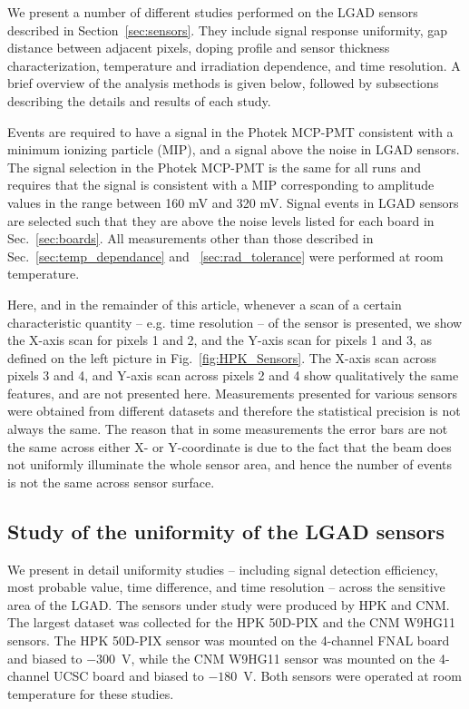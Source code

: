 \documentclass[preprint,1p]{elsarticle}
\begin{document}
We present a number of different studies performed on the LGAD sensors 
described in Section~\ref{sec:sensors}. They include signal response 
uniformity, gap distance between adjacent pixels, 
doping profile and sensor thickness characterization,
temperature and irradiation dependence, and time resolution. A brief overview of the
analysis methods is given below, followed by subsections describing
the details and results of each study.

Events are required to have a signal in the Photek MCP-PMT consistent with a
minimum ionizing particle (MIP), and a signal above the noise in LGAD sensors.
The signal selection in the Photek MCP-PMT is the same for all runs and requires
that the signal is consistent with a MIP corresponding to amplitude values in
the range between 160 mV and 320 mV. Signal events in LGAD sensors are selected
such that they are above the noise levels listed for each board in
Sec.~\ref{sec:boards}. All measurements other than those described in
Sec.~\ref{sec:temp_dependance} and ~\ref{sec:rad_tolerance} were performed at
room temperature. 

Here, and in the remainder of this article, whenever a scan of a certain
characteristic quantity -- e.g. time resolution -- of the sensor is presented,
we show the X-axis scan for pixels 1 and 2, and the Y-axis scan for pixels 1 and
3, as defined on the left picture in Fig.~\ref{fig:HPK_Sensors}. The X-axis scan
across pixels 3 and 4, and Y-axis scan across pixels 2 and 4 show qualitatively
the same features, and are not presented here. Measurements presented for
various sensors were obtained from different datasets and therefore the
statistical precision is not always the same. The reason that in some
measurements the error bars are not the same across either X- or Y-coordinate is
due to the fact that the beam does not uniformly illuminate the whole sensor
area, and hence the number of events is not the same across sensor surface.


\subsection{Study of the uniformity of the LGAD sensors}
\label{sec:HPK_CNM_uniformity}

We present in detail uniformity studies -- including signal detection
efficiency, most probable value, time difference, and time resolution  -- across the sensitive
area of the LGAD. The sensors under study were produced
by HPK and CNM. The largest dataset was collected for the 
HPK 50D-PIX and the CNM W9HG11 sensors. The 
HPK 50D-PIX sensor was mounted on the 4-channel FNAL board and biased to $-300$~V, while the 
CNM W9HG11 sensor was mounted on the 4-channel UCSC board and biased to $-180$~V.
Both sensors were operated at room temperature for these studies. 
\end{document}
